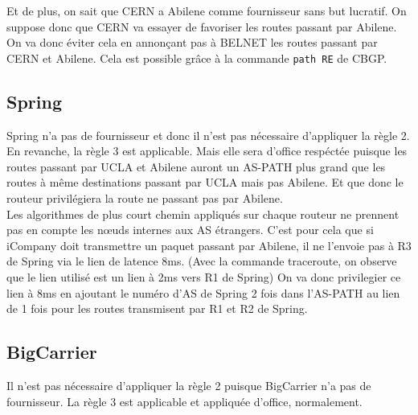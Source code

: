 \documentclass[a4paper, 12pt]{article}
\begin{document}
Et de plus, on sait que CERN a Abilene comme fournisseur sans but lucratif. %
On suppose donc que CERN va essayer de favoriser les routes passant par Abilene.
On va donc éviter cela en annonçant pas à BELNET les routes passant par CERN et Abilene.
Cela est possible grâce à la commande \texttt{path RE} de CBGP.

\subsection{Spring} %
Spring n'a pas de fournisseur et donc il n'est pas nécessaire d'appliquer la règle 2.
\\

En revanche, la règle 3 est applicable.
Mais elle sera d'office respéctée puisque les routes passant par UCLA et Abilene auront un AS-PATH plus grand que les routes à même destinations passant par UCLA mais pas Abilene.
Et que donc le routeur privilégiera la route ne passant pas par Abilene.
\\

Les algorithmes de plus court chemin appliqués sur chaque routeur ne prennent pas en compte les nœuds internes aux AS étrangers.
C'est pour cela que si iCompany doit transmettre un paquet passant par Abilene, il ne l'envoie pas à R3 de Spring via le lien de latence 8ms.
(Avec la commande traceroute, on observe que le lien utilisé est un lien à 2ms vers R1 de Spring)
On va donc privilegier ce lien à 8ms en ajoutant le numéro d'AS de Spring 2 fois dans l'AS-PATH au lien de 1 fois pour les routes transmisent par R1 et R2 de Spring.

\subsection{BigCarrier}%
Il n'est pas nécessaire d'appliquer la règle 2 puisque BigCarrier n'a pas de fournisseur.
La règle 3 est applicable et appliquée d'office, normalement.
\end{document}
